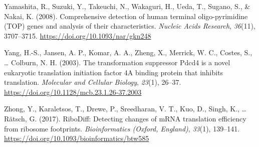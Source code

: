 \documentclass[12pt,openany]{book}
\begin{document}
\hypertarget{ref-Yamashita2008}{}
Yamashita, R., Suzuki, Y., Takeuchi, N., Wakaguri, H., Ueda, T., Sugano,
S., \& Nakai, K. (2008). Comprehensive detection of human terminal
oligo-pyrimidine (TOP) genes and analysis of their characteristics.
\emph{Nucleic Acids Research}, \emph{36}(11), 3707--3715.
\url{https://doi.org/10.1093/nar/gkn248}

\hypertarget{ref-Yang2003}{}
Yang, H.-S., Jansen, A. P., Komar, A. A., Zheng, X., Merrick, W. C.,
Costes, S., \ldots{} Colburn, N. H. (2003). The transformation
suppressor Pdcd4 is a novel eukaryotic translation initiation factor 4A
binding protein that inhibits translation. \emph{Molecular and Cellular
Biology}, \emph{23}(1), 26--37.
\url{https://doi.org/10.1128/mcb.23.1.26-37.2003}

\hypertarget{ref-Zhong2017}{}
Zhong, Y., Karaletsos, T., Drewe, P., Sreedharan, V. T., Kuo, D., Singh,
K., \ldots{} Rätsch, G. (2017). RiboDiff: Detecting changes of mRNA
translation efficiency from ribosome footprints. \emph{Bioinformatics
(Oxford, England)}, \emph{33}(1), 139--141.
\url{https://doi.org/10.1093/bioinformatics/btw585}
\end{document}
